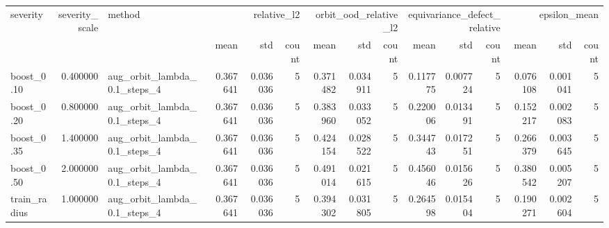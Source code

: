 \begin{tabular}{lrlrrrrrrrrrrrr}
\toprule
severity & severity_scale & method & \multicolumn{3}{r}{relative_l2} & \multicolumn{3}{r}{orbit_ood_relative_l2} & \multicolumn{3}{r}{equivariance_defect_relative} & \multicolumn{3}{r}{epsilon_mean} \\
 &  &  & mean & std & count & mean & std & count & mean & std & count & mean & std & count \\
\midrule
boost_0.10 & 0.400000 & aug_orbit_lambda_0.1_steps_4 & 0.367641 & 0.036036 & 5 & 0.371482 & 0.034911 & 5 & 0.117775 & 0.007724 & 5 & 0.076108 & 0.001041 & 5 \\
boost_0.20 & 0.800000 & aug_orbit_lambda_0.1_steps_4 & 0.367641 & 0.036036 & 5 & 0.383960 & 0.033052 & 5 & 0.220006 & 0.013491 & 5 & 0.152217 & 0.002083 & 5 \\
boost_0.35 & 1.400000 & aug_orbit_lambda_0.1_steps_4 & 0.367641 & 0.036036 & 5 & 0.424154 & 0.028522 & 5 & 0.344743 & 0.017251 & 5 & 0.266379 & 0.003645 & 5 \\
boost_0.50 & 2.000000 & aug_orbit_lambda_0.1_steps_4 & 0.367641 & 0.036036 & 5 & 0.491014 & 0.021615 & 5 & 0.456046 & 0.015626 & 5 & 0.380542 & 0.005207 & 5 \\
train_radius & 1.000000 & aug_orbit_lambda_0.1_steps_4 & 0.367641 & 0.036036 & 5 & 0.394302 & 0.031805 & 5 & 0.264598 & 0.015404 & 5 & 0.190271 & 0.002604 & 5 \\
\bottomrule
\end{tabular}
